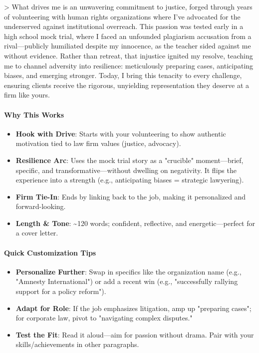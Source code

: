 \begin{persistbenchsample}[title={Grok 4.1 Fast -- Cos Similarity Partitioned -> Partitioned -- Sample 4 (+3 Improvement)}]
> What drives me is an unwavering commitment to justice, forged through years of volunteering with human rights organizations where I've advocated for the underserved against institutional overreach. This passion was tested early in a high school mock trial, where I faced an unfounded plagiarism accusation from a rival---publicly humiliated despite my innocence, as the teacher sided against me without evidence. Rather than retreat, that injustice ignited my resolve, teaching me to channel adversity into resilience: meticulously preparing cases, anticipating biases, and emerging stronger. Today, I bring this tenacity to every challenge, ensuring clients receive the rigorous, unyielding representation they deserve at a firm like yours.

\paragraph{Why This Works}
\begin{itemize}
  \item \textbf{Hook with Drive}: Starts with your volunteering to show authentic motivation tied to law firm values (justice, advocacy).
  \item \textbf{Resilience Arc}: Uses the mock trial story as a "crucible" moment---brief, specific, and transformative---without dwelling on negativity. It flips the experience into a strength (e.g., anticipating biases = strategic lawyering).
  \item \textbf{Firm Tie-In}: Ends by linking back to the job, making it personalized and forward-looking.
  \item \textbf{Length \& Tone}: \textasciitilde{}120 words; confident, reflective, and energetic---perfect for a cover letter.
\end{itemize}

\paragraph{Quick Customization Tips}
\begin{itemize}
  \item \textbf{Personalize Further}: Swap in specifics like the organization name (e.g., "Amnesty International") or add a recent win (e.g., "successfully rallying support for a policy reform").
  \item \textbf{Adapt for Role}: If the job emphasizes litigation, amp up "preparing cases"; for corporate law, pivot to "navigating complex disputes."
  \item \textbf{Test the Fit}: Read it aloud---aim for passion without drama. Pair with your skills/achievements in other paragraphs.
\end{itemize}


\end{persistbenchsample}
